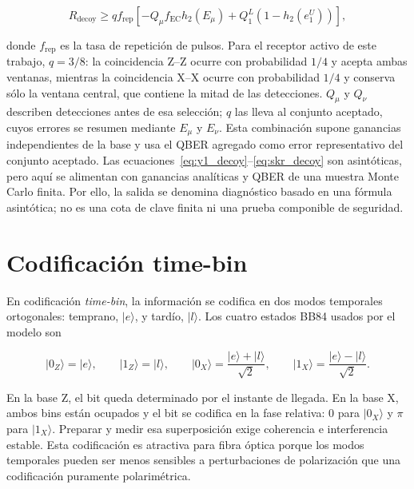 \begin{equation}
  R_\text{decoy} \geq q f_\text{rep}
  \left[- Q_\mu f_\text{EC} h_2(E_\mu) + Q_1^L (1-h_2(e_1^U)) \right],
  \label{eq:skr_decoy}
\end{equation}

donde \(f_\text{rep}\) es la tasa de repetición de pulsos. Para el receptor activo de este trabajo, \(q=3/8\): la coincidencia Z--Z ocurre con probabilidad \(1/4\) y acepta ambas ventanas, mientras la coincidencia X--X ocurre con probabilidad \(1/4\) y conserva sólo la ventana central, que contiene la mitad de las detecciones. \(Q_\mu\) y \(Q_\nu\) describen detecciones antes de esa selección; \(q\) las lleva al conjunto aceptado, cuyos errores se resumen mediante \(E_\mu\) y \(E_\nu\). Esta combinación supone ganancias independientes de la base y usa el QBER agregado como error representativo del conjunto aceptado. Las ecuaciones~\eqref{eq:y1_decoy}--\eqref{eq:skr_decoy} son asintóticas, pero aquí se alimentan con ganancias analíticas y QBER de una muestra Monte Carlo finita. Por ello, la salida se denomina diagnóstico basado en una fórmula asintótica; no es una cota de clave finita ni una prueba componible de seguridad.

\section{Codificación time-bin}

En codificación \textit{time-bin}, la información se codifica en dos modos temporales ortogonales: temprano, \(\lvert e\rangle\), y tardío, \(\lvert l\rangle\). Los cuatro estados BB84 usados por el modelo son

\begin{equation}
  \lvert 0_Z\rangle=\lvert e\rangle,\qquad
  \lvert 1_Z\rangle=\lvert l\rangle,\qquad
  \lvert 0_X\rangle=\frac{\lvert e\rangle+\lvert l\rangle}{\sqrt{2}},\qquad
  \lvert 1_X\rangle=\frac{\lvert e\rangle-\lvert l\rangle}{\sqrt{2}}.
  \label{eq:bb84_timebin_states}
\end{equation}

En la base Z, el bit queda determinado por el instante de llegada. En la base X, ambos bins están ocupados y el bit se codifica en la fase relativa: \(0\) para \(\lvert 0_X\rangle\) y \(\pi\) para \(\lvert 1_X\rangle\). Preparar y medir esa superposición exige coherencia e interferencia estable. Esta codificación es atractiva para fibra óptica porque los modos temporales pueden ser menos sensibles a perturbaciones de polarización que una codificación puramente polarimétrica.

